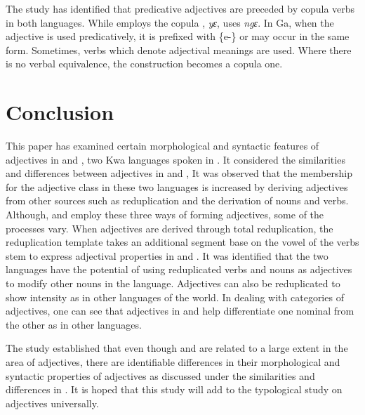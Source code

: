 \documentclass[output=paper,
modfonts
]{langscibook}
\begin{document}
The study has identified that predicative adjectives are preceded by copula verbs in both languages. While  employs the copula , \textit{yɛ},  uses \textit{ngɛ}. In Ga, when the adjective is used predicatively, it is prefixed with \{e-\} or may occur in the same form. Sometimes, verbs which denote adjectival meanings are used. Where there is no verbal equivalence, the construction becomes a copula one. 


\section{Conclusion}\label{sec:caesar:5} 

This paper has examined certain morphological and syntactic features of adjectives in  and , two Kwa languages spoken in . It considered the similarities and differences between adjectives in  and , It was observed that the membership for the adjective class in these two languages is increased by deriving adjectives from other sources such as reduplication and the derivation of nouns and verbs. Although,  and  employ these three ways of forming adjectives, some of the processes vary. When adjectives are derived through total reduplication, the reduplication template takes an additional segment base on the vowel of the verbs stem to express adjectival properties in  and . It was identified that the two languages have the potential of using reduplicated verbs and nouns as adjectives to modify other nouns in the language. Adjectives can also be reduplicated to show intensity as in other languages of the world. In dealing with categories of adjectives, one can see that adjectives in  and  help differentiate one nominal from the other as in other languages. 



The study established that even though  and  are related to a large extent in the area of adjectives, there are identifiable differences in their morphological and syntactic properties of adjectives as discussed under the similarities and differences in . It is hoped that this study will add to the typological study on adjectives universally.

 
 
\end{document}
